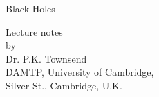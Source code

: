 \thispagestyle{empty}
\begin{center}
\Huge{Black Holes}

\vspace{1in}
\begin{center}\end{center}
\vspace{1in}

\Large{Lecture notes \\
 by \\
\vspace{0.25in}
Dr. P.K. Townsend \\
\vspace{0.25in} 
DAMTP, University of Cambridge, \\ Silver St., Cambridge, U.K. }

\end{center}

\clearpage
